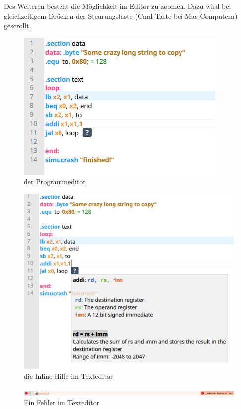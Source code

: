 Des Weiteren besteht die Möglichkeit im Editor zu zoomen. Dazu wird bei gleichzeitigem
Drücken der Steurungstaste (Cmd-Taste bei Mac-Computern) gescrollt.

\begin{figure}[ht]
	\centering
  \includegraphics[scale=1]{Images/Editor}
	\caption{der Programmeditor}
	\label{Editor}
\end{figure}


\begin{figure}[ht]
	\centering
  \includegraphics[scale=1]{Images/Editor_help}
	\caption{die Inline-Hilfe im Texteditor}
	\label{Editor_Help}
\end{figure}



\begin{figure}[ht]
	\centering
  \includegraphics[width=\textwidth]{Images/Editor_error}
	\caption{Ein Fehler im Texteditor}
	\label{Editor_Error}
\end{figure}



